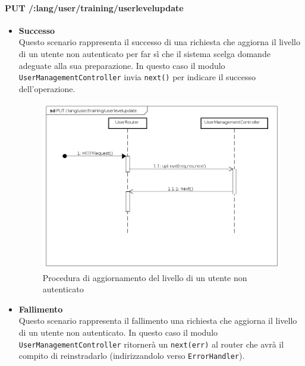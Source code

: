\paragraph{PUT /:lang/user/training/userlevelupdate}
\begin{itemize}
\item \textbf{Successo}\\
Questo scenario rappresenta il successo di una richiesta che aggiorna il livello di un utente non autenticato per far sì che il sistema scelga domande adeguate alla sua preparazione. In questo caso il modulo \texttt{UserManagementController} invia \texttt{next()} per indicare il successo dell'operazione.

\begin{figure}[ht]
	\centering
	\includegraphics[scale=0.45]{UML/DiagrammiDiSequenza/Back-end/PUT__lang_user_training_userlevelupdate_success.png}
	\caption{Procedura di aggiornamento del livello di un utente non autenticato}
\end{figure}
\FloatBarrier

\item \textbf{Fallimento}\\
Questo scenario rappresenta il fallimento una richiesta che aggiorna il livello di un utente non autenticato. In questo caso il modulo \texttt{UserManagementController} ritornerà un \texttt{next(err)} al router che avrà il compito di reinstradarlo (indirizzandolo verso \texttt{ErrorHandler}).


\end{itemize}
